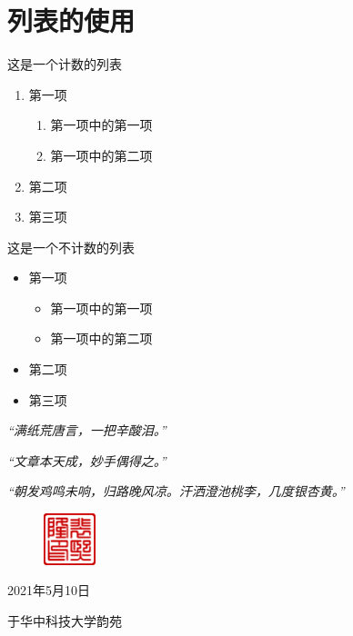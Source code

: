 \documentclass[supercite]{HustGraduPaper}
\begin{document}
\section{列表的使用}
这是一个计数的列表
\begin{enumerate}
	\item 第一项
	      \begin{enumerate}
		      \item 第一项中的第一项
		      \item 第一项中的第二项
	      \end{enumerate}
	\item 第二项
	\item 第三项
\end{enumerate}

这是一个不计数的列表
\begin{itemize}
	\item 第一项
	      \begin{itemize}
		      \item 第一项中的第一项
		      \item 第一项中的第二项
	      \end{itemize}
	\item 第二项
	\item 第三项
\end{itemize}

\begin{thankpage}
	
	\begin{center}
		{\itshape “满纸荒唐言，一把辛酸泪。”}
	\end{center}
	



	{\itshape “文章本天成，妙手偶得之。”}

	{\itshape “朝发鸡鸣未响，归路晚风凉。汗洒澄池桃李，几度银杏黄。”}

	\begin{figure}[htb]
		\flushright
		\includegraphics[width=15mm]{Figures/Seal-pxl.pdf}
	\end{figure}

	\begin{flushright}
		2021年5月10日

		于华中科技大学韵苑
	\end{flushright}
	
\end{thankpage}
\end{document}
